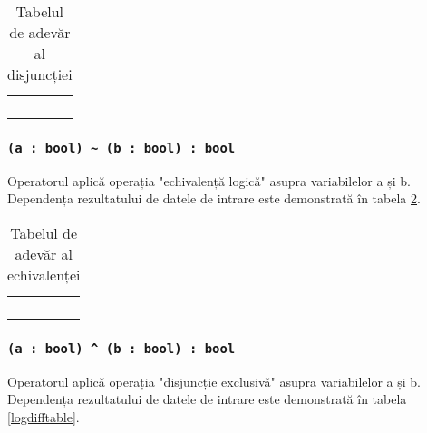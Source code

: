 \begin{table}[htb]
	\caption{Tabelul de adevăr al disjuncției}
	\label{distable}
	\begin{tabular}{|c|c|c|}
		\hline
		\code{a} & \code{b} & \code{a \| b} 	\\ \hline
		\false{} & \false{} & \false{} 		\\ \hline
		\false{} & \true{}  & \true{}  		\\ \hline
		\true{}  & \false{} & \true{}  		\\ \hline
		\true{}  & \true{}  & \true{}  		\\ \hline
	\end{tabular}
	\vspace{-2em}
\end{table}

\subsubsection{\lstinline|(a : bool) ~ (b : bool) : bool|}

Operatorul aplică operația "echivalență logică" asupra variabilelor a și b. Dependența rezultatului de datele de intrare este demonstrată în tabela \ref{logeqtable}.

\begin{table}[htb]
	\caption{Tabelul de adevăr al echivalenței}
	\label{logeqtable}
	\begin{tabular}{|c|c|c|}
		\hline
		\code{a} & \code{b} & \code{a \~ b} \\ \hline
		\false{} & \false{} & \true{}   	\\ \hline
		\false{} & \true{}  & \false{}  	\\ \hline
		\true{}  & \false{} & \false{}  	\\ \hline
		\true{}  & \true{}  & \true{}   	\\ \hline
	\end{tabular}
	\vspace{0em}
\end{table}

\subsubsection{\lstinline|(a : bool) ^ (b : bool) : bool|}

Operatorul aplică operația "disjuncție exclusivă" asupra variabilelor a și b. Dependența rezultatului de datele de intrare este demonstrată în tabela \ref{logdifftable}.

